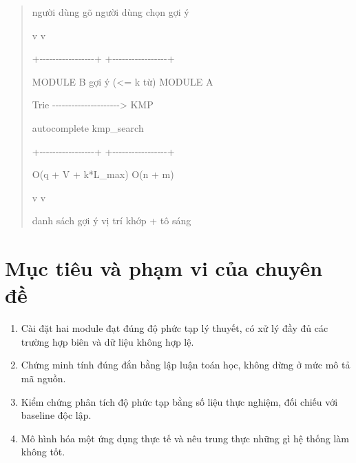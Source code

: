 \begin{quote}
người dùng gõ người dùng chọn gợi ý

\textbar{} \textbar{}

v v

+-\/-\/-\/-\/-\/-\/-\/-\/-\/-\/-\/-\/-\/-\/-\/-\/-+
+-\/-\/-\/-\/-\/-\/-\/-\/-\/-\/-\/-\/-\/-\/-\/-\/-+

\textbar{} MODULE B \textbar{} gợi ý (\textless= k từ) \textbar{} MODULE
A \textbar{}

\textbar{} Trie
\textbar-\/-\/-\/-\/-\/-\/-\/-\/-\/-\/-\/-\/-\/-\/-\/-\/-\/-\/-\/-\/-\textgreater\textbar{}
KMP \textbar{}

\textbar{} autocomplete \textbar{} \textbar{} kmp\_search \textbar{}

+-\/-\/-\/-\/-\/-\/-\/-\/-\/-\/-\/-\/-\/-\/-\/-\/-+
+-\/-\/-\/-\/-\/-\/-\/-\/-\/-\/-\/-\/-\/-\/-\/-\/-+

\textbar{} \textbar{}

O(\textbar q\textbar{} + V + k*L\_max) O(n + m)

\textbar{} \textbar{}

v v

danh sách gợi ý vị trí khớp + tô sáng
\end{quote}

\begin{center}
\end{center}

\section{Mục tiêu và phạm vi của chuyên đề}
\label{sec:1-5}

\begin{enumerate}
\def\labelenumi{\arabic{enumi}.}
\item
  Cài đặt hai module đạt đúng độ phức tạp lý thuyết, có xử lý đầy đủ các
  trường hợp biên và dữ liệu không hợp lệ.
\item
  Chứng minh tính đúng đắn bằng lập luận toán học, không dừng ở mức mô
  tả mã nguồn.
\item
  Kiểm chứng phân tích độ phức tạp bằng số liệu thực nghiệm, đối chiếu
  với baseline độc lập.
\item
  Mô hình hóa một ứng dụng thực tế và nêu trung thực những gì hệ thống
  làm không tốt.
\end{enumerate}

